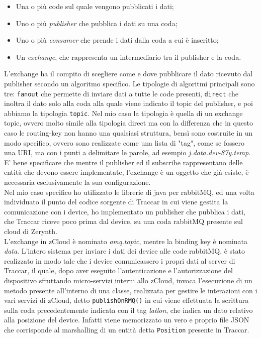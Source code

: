 \documentclass[a4paper,titlepage,12pt]{report}
\begin{document}
{\begin{itemize}
\item Una o più code sul quale vengono pubblicati i dati;
\item Uno o più \textit{publisher} che pubblica i dati su una coda;
\item Uno o più \textit{consumer} che prende i dati dalla coda a cui è inscritto;
\item Un \textit{exchange}, che rappresenta un intermediario tra il publisher e la coda. 
\end{itemize}
L'exchange ha il compito di scegliere come e dove pubblicare il dato ricevuto dal publisher secondo un algoritmo specifico. Le tipologie di algoritmi principali sono tre: \texttt{fanout} che permette di inviare dati a tutte le code presenti, \texttt{direct} che inoltra il dato solo alla coda alla quale viene indicato il topic del publisher, e poi abbiamo la tipologia \texttt{topic}. Nel mio caso la tipologia è quella di un exchange topic, ovvero molto simile alla tipologia direct ma con la differenza che in questo caso le routing-key non hanno una qualsiasi struttura, bensì sono costruite in un modo specifico, ovvero sono realizzate come una lista di "tag", come se fossero una URI, ma con i punti a delimitare le parole, ad esempio \textit{j.data.dev-87y.temp}.
E' bene specificare che mentre il publisher ed il subscribe rappresentano delle entità che devono essere implementate, l'exchange è un oggetto che già esiste, è necessaria esclusivamente la sua configurazione.\\
Nel mio caso specifico ho utilizzato le librerie di java per rabbitMQ, ed una volta individuato il punto del codice sorgente di Traccar in cui viene gestita la comunicazione con i device, ho implementato un publisher che pubblica i dati, che Traccar riceve poco prima dal device, su una coda rabbitMQ presente sul cloud di Zerynth.\\
L'exchange in zCloud è nominato \textit{amq.topic}, mentre la binding key è nominata \textit{data}. L'intero sistema per inviare i dati dei device alle code rabbitMQ, è stato realizzato in modo tale che i device comunicassero i propri dati al server di Traccar, il quale, dopo aver eseguito l'autenticazione e l'autorizzazione del dispositivo sfruttando micro-servizi interni allo zCloud, invoca l'esecuzione di un metodo presente all'interno di una classe, realizzata per gestire le interazioni con i vari servizi di zCloud, detto \texttt{publishOnRMQ()} in cui viene effettuata la scrittura sulla coda precedentemente indicata con il tag \textit{latlon}, che indica un dato relativo alla posizione del device. Infatti viene memorizzato un vero e proprio file JSON che corrisponde al marshalling di un entità detta \texttt{Position} presente in Traccar.


}
\end{document}
